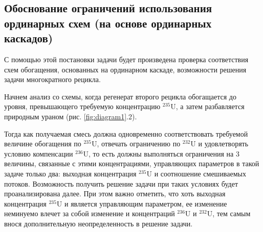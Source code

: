 \subsection{Обоснование ограничений использования ординарных схем (на основе ординарных каскадов)}

С помощью этой постановки задачи будет произведена проверка соответствия схем обогащения, основанных на ординарном каскаде, возможности решения задачи многократного рецикла.

Начнем анализ со схемы, когда регенерат второго рецикла обогащается до уровня, превышающего требуемую концентрацию $^{235}$U, а затем разбавляется природным ураном (рис. \ref{fig:diagram1}.2).

Тогда как получаемая смесь должна одновременно соответствовать требуемой величине обогащения по $^{235}$U, отвечать ограничению по $^{232}$U и удовлетворять условию компенсации $^{236}$U, то есть должны выполняться ограничения на 3 величины, связанные с этими концентрациями, управляющих параметров в такой задаче только два: выходная концентрация $^{235}$U и соотношение смешиваемых потоков. Возможность получить решение задачи при таких условиях будет проанализирована далее.  При этом важно отметить, что хоть выходная концентрация $^{235}$U и является управляющим параметром, ее изменение неминуемо влечет за собой изменение и концентраций $^{236}$U и $^{232}$U, тем самым внося дополнительную неопределенность в решение задачи.  

